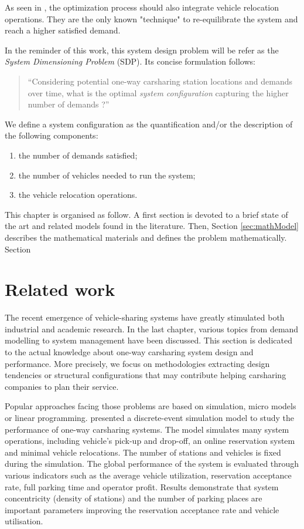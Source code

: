 \begin{bibunit}[ieeetr]
As seen in \cite{jorge_testing_2012}, the optimization process should also integrate vehicle relocation operations.
They are the only known "technique" to re-equilibrate the system and reach a higher satisfied demand.

In the reminder of this work, this system design problem will be refer as the \emph{System Dimensioning Problem} (SDP).
Its concise formulation follows:
\begin{quote}
``Considering potential one-way carsharing station locations and demands over time, what is the optimal \emph{system configuration} capturing the higher number of demands ?''
\end{quote}

We define a system configuration as the quantification and/or the description of the following components:
\begin{enumerate}
\item the number of demands satisfied;
\item the number of vehicles needed to run the system;
\item the vehicle relocation operations.
\end{enumerate}

This chapter is organised as follow.
A first section is devoted to a brief state of the art and related models found in the literature.
Then, Section \ref{sec:mathModel} describes the mathematical materials and defines the problem mathematically.
Section 


\section{Related work}

The recent emergence of vehicle-sharing systems have greatly stimulated both industrial and academic research.
In the last chapter, various topics from demand modelling to system management have been discussed.
This section is dedicated to the actual knowledge about one-way carsharing system design and performance.
More precisely, we focus on methodologies extracting design tendencies or structural configurations that may contribute helping carsharing companies to plan their service.

\medskip
Popular approaches facing those problems are based on simulation, micro models or linear programming.
\cite{li_design_2011} presented a discrete-event simulation model to study the performance of one-way carsharing systems.
The model simulates many system operations, including vehicle's pick-up and drop-off, an online reservation system and minimal vehicle relocations.
The number of stations and vehicles is fixed during the simulation.
The global performance of the system is evaluated through various indicators such as the average vehicle utilization, reservation acceptance rate, full parking time and operator profit.
Results demonstrate that system concentricity (density of stations) and the number of parking places are important parameters improving the reservation acceptance rate and vehicle utilisation.



\end{bibunit}
